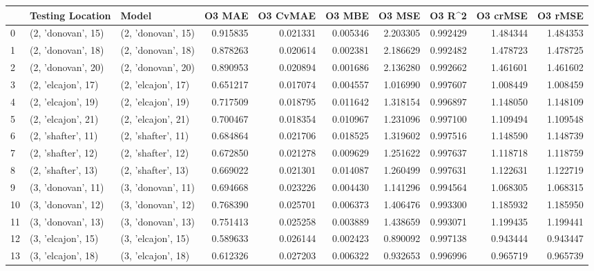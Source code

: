 \begin{tabular}{lllrrrrrrr}
\toprule
{} &    Testing Location &               Model &    O3 MAE &  O3 CvMAE &    O3 MBE &     O3 MSE &    O3 R\textasciicircum2 &  O3 crMSE &   O3 rMSE \\
\midrule
0  &  (2, 'donovan', 15) &  (2, 'donovan', 15) &  0.915835 &  0.021331 &  0.005346 &   2.203305 &  0.992429 &  1.484344 &  1.484353 \\
1  &  (2, 'donovan', 18) &  (2, 'donovan', 18) &  0.878263 &  0.020614 &  0.002381 &   2.186629 &  0.992482 &  1.478723 &  1.478725 \\
2  &  (2, 'donovan', 20) &  (2, 'donovan', 20) &  0.890953 &  0.020894 &  0.001686 &   2.136280 &  0.992662 &  1.461601 &  1.461602 \\
3  &  (2, 'elcajon', 17) &  (2, 'elcajon', 17) &  0.651217 &  0.017074 &  0.004557 &   1.016990 &  0.997607 &  1.008449 &  1.008459 \\
4  &  (2, 'elcajon', 19) &  (2, 'elcajon', 19) &  0.717509 &  0.018795 &  0.011642 &   1.318154 &  0.996897 &  1.148050 &  1.148109 \\
5  &  (2, 'elcajon', 21) &  (2, 'elcajon', 21) &  0.700467 &  0.018354 &  0.010967 &   1.231096 &  0.997100 &  1.109494 &  1.109548 \\
6  &  (2, 'shafter', 11) &  (2, 'shafter', 11) &  0.684864 &  0.021706 &  0.018525 &   1.319602 &  0.997516 &  1.148590 &  1.148739 \\
7  &  (2, 'shafter', 12) &  (2, 'shafter', 12) &  0.672850 &  0.021278 &  0.009629 &   1.251622 &  0.997637 &  1.118718 &  1.118759 \\
8  &  (2, 'shafter', 13) &  (2, 'shafter', 13) &  0.669022 &  0.021301 &  0.014087 &   1.260499 &  0.997631 &  1.122631 &  1.122719 \\
9  &  (3, 'donovan', 11) &  (3, 'donovan', 11) &  0.694668 &  0.023226 &  0.004430 &   1.141296 &  0.994564 &  1.068305 &  1.068315 \\
10 &  (3, 'donovan', 12) &  (3, 'donovan', 12) &  0.768390 &  0.025701 &  0.006373 &   1.406476 &  0.993300 &  1.185932 &  1.185950 \\
11 &  (3, 'donovan', 13) &  (3, 'donovan', 13) &  0.751413 &  0.025258 &  0.003889 &   1.438659 &  0.993071 &  1.199435 &  1.199441 \\
12 &  (3, 'elcajon', 15) &  (3, 'elcajon', 15) &  0.589633 &  0.026144 &  0.002423 &   0.890092 &  0.997138 &  0.943444 &  0.943447 \\
13 &  (3, 'elcajon', 18) &  (3, 'elcajon', 18) &  0.612326 &  0.027203 &  0.006322 &   0.932653 &  0.996996 &  0.965719 &  0.965739 \\

\end{tabular}
